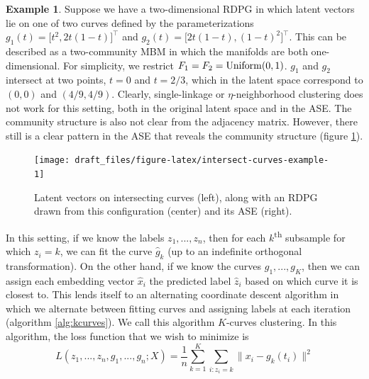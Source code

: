 \documentclass[
  12pt,
]{article}
\theoremstyle{definition}
\theoremstyle{definition}
\newtheorem{example}{Example}[section]
\theoremstyle{definition}
\theoremstyle{definition}
\theoremstyle{remark}
\begin{document}
\begin{example}
\label{ex:intersect-curves}
Suppose we have a two-dimensional RDPG in which latent vectors lie on one of two curves defined by the parameterizations $g_1(t) = \Big[ t^2, 2 t (1-t) \Big]^\top$ and $g_2(t) = \Big[ 2 t (1-t), (1-t)^2 \Big]^\top$. 
This can be described as a two-community MBM in which the manifolds are both one-dimensional. 
For simplicity, we restrict $F_1 = F_2 = \mathrm{Uniform}(0, 1)$. 
$g_1$ and $g_2$ intersect at two points, $t = 0$ and $t = 2/3$, which in the latent space correspond to $(0, 0)$ and $(4/9, 4/9)$. 
Clearly, single-linkage or $\eta$-neighborhood clustering does not work for this setting, both in the original latent space and in the ASE. 
The community structure is also not clear from the adjacency matrix. 
However, there still is a clear pattern in the ASE that reveals the community structure (figure \ref{fig:intersect-curves-example}). 

\begin{figure}[H]

{\centering \texttt{[image: draft\_files/figure-latex/intersect-curves-example-1]} 

}

\caption{Latent vectors on intersecting curves (left), along with an RDPG drawn from this configuration (center) and its ASE (right).}\label{fig:intersect-curves-example}
\end{figure}
\end{example}

In this setting, if we know the labels \(z_1, ..., z_n\), then for each \(k\)\textsuperscript{th} subsample for which \(z_i = k\), we can fit the curve \(\hat{g}_k\) (up to an indefinite orthogonal transformation).
On the other hand, if we know the curves \(g_1, ..., g_K\), then we can assign each embedding vector \(\hat{x}_i\) the predicted label \(\hat{z}_i\) based on which curve it is closest to.
This lends itself to an alternating coordinate descent algorithm in which we alternate between fitting curves and assigning labels at each iteration (algorithm \ref{alg:kcurves}).
We call this algorithm \(K\)-curves clustering.
In this algorithm, the loss function that we wish to minimize is
\begin{equation}
\label{eq:kcurves-loss}
L(z_1, ..., z_n, g_1, ..., g_n; X) = \frac{1}{n} \sum_{k=1}^K \sum_{i: z_i = k} \|x_i - g_k(t_i)\|^2
\end{equation}
\end{document}
